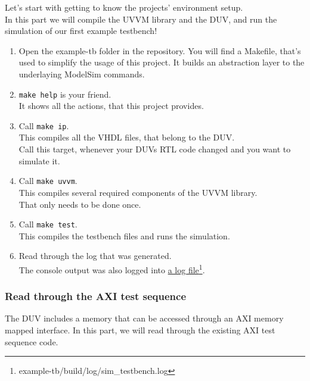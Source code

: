 Let's start with getting to know the projects' environment setup. \\
In this part we will compile the UVVM library and the DUV, and run the simulation of our first example testbench!

\begin{enumerate}
      \item Open the example-tb folder in the repository.
            You will find a Makefile, that's used to simplify the usage of this project. It builds an abstraction layer to the underlaying ModelSim commands.
      \item \texttt{make help} is your friend. \\
            It shows all the actions, that this project provides.
      \item Call \texttt{make ip}. \\
            This compiles all the VHDL files, that belong to the DUV.\\
            Call this target, whenever your DUVs RTL code changed and you want to simulate it.
      \item Call \texttt{make uvvm}. \\
            This compiles several required components of the UVVM library. \\
            That only needs to be done once.
      \item Call \texttt{make test}. \\
            This compiles the testbench files and runs the simulation.
      \item Read through the log that was generated.\\
            The console output was also logged into \href{example-tb/build/log/sim\_testbench.log}{a log file}\footnote{example-tb/build/log/sim\_testbench.log}.
\end{enumerate}

\subsubsection{Read through the AXI test sequence}

The DUV includes a memory that can be accessed through an AXI memory mapped interface. In this part, we will read through the existing AXI test sequence code.

